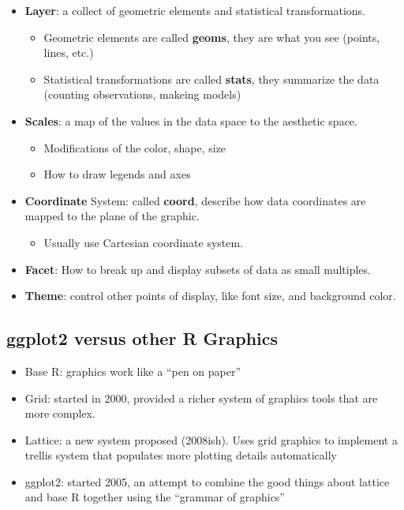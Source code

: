\documentclass[
]{book}
\providecommand{\tightlist}{%
  \setlength{\itemsep}{0pt}\setlength{\parskip}{0pt}}
\begin{document}
\begin{itemize}
\item
  \textbf{Layer}: a collect of geometric elements and statistical transformations.

  \begin{itemize}
  \item
    Geometric elements are called \textbf{geoms}, they are what you see (points, lines, etc.)
  \item
    Statistical transformations are called \textbf{stats}, they summarize the data (counting observations, makeing models)
  \end{itemize}
\item
  \textbf{Scales}: a map of the values in the data space to the aesthetic space.

  \begin{itemize}
  \item
    Modifications of the color, shape, size
  \item
    How to draw legends and axes
  \end{itemize}
\item
  \textbf{Coordinate} System: called \textbf{coord}, describe how data coordinates are mapped to the plane of the graphic.

  \begin{itemize}
  \tightlist
  \item
    Usually use Cartesian coordinate system.
  \end{itemize}
\item
  \textbf{Facet}: How to break up and display subsets of data as small multiples.
\item
  \textbf{Theme}: control other points of display, like font size, and background color.
\end{itemize}

\hypertarget{ggplot2-versus-other-r-graphics}{%
\subsection*{ggplot2 versus other R Graphics}\label{ggplot2-versus-other-r-graphics}}

\begin{itemize}
\item
  Base R: graphics work like a ``pen on paper''
\item
  Grid: started in 2000, provided a richer system of graphics tools that are more complex.
\item
  Lattice: a new system proposed (2008ish). Uses grid graphics to implement a trellis system that populates more plotting details automatically
\item
  ggplot2: started 2005, an attempt to combine the good things about lattice and base R together using the ``grammar of graphics''
\end{itemize}
\end{document}
